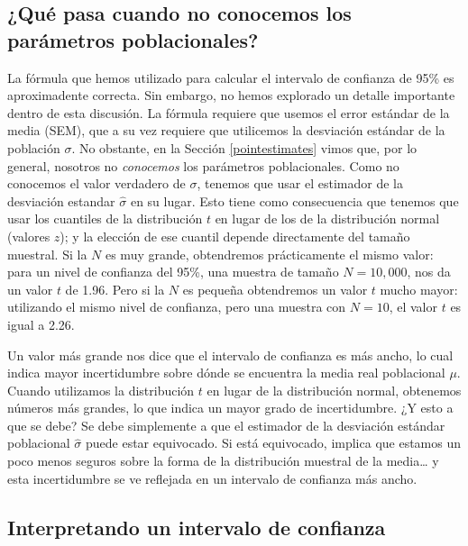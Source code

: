 \documentclass[spanish,]{book}
\begin{document}
\subsection{¿Qué pasa cuando no conocemos los parámetros
poblacionales?}\label{que-pasa-cuando-no-conocemos-los-parametros-poblacionales}

La fórmula que hemos utilizado para calcular el intervalo de confianza
de 95\% es aproximadente correcta. Sin embargo, no hemos explorado un
detalle importante dentro de esta discusión. La fórmula requiere que
usemos el error estándar de la media (SEM), que a su vez requiere que
utilicemos la desviación estándar de la población \(\sigma\). No
obstante, en la Sección \ref{pointestimates} vimos que, por lo general,
nosotros no \emph{conocemos} los parámetros poblacionales. Como no
conocemos el valor verdadero de \(\sigma\), tenemos que usar el
estimador de la desviación estandar \(\hat{\sigma}\) en su lugar. Esto
tiene como consecuencia que tenemos que usar los cuantiles de la
distribución \(t\) en lugar de los de la distribución normal (valores
\(z\)); y la elección de ese cuantil depende directamente del tamaño
muestral. Si la \(N\) es muy grande, obtendremos prácticamente el mismo
valor: para un nivel de confianza del 95\%, una muestra de tamaño
\(N=10,000\), nos da un valor \(t\) de 1.96. Pero si la \(N\) es pequeña
obtendremos un valor \(t\) mucho mayor: utilizando el mismo nivel de
confianza, pero una muestra con \(N=10\), el valor \(t\) es igual a
2.26.

Un valor más grande nos dice que el intervalo de confianza es más ancho,
lo cual indica mayor incertidumbre sobre dónde se encuentra la media
real poblacional \(\mu\). Cuando utilizamos la distribución \(t\) en
lugar de la distribución normal, obtenemos números más grandes, lo que
indica un mayor grado de incertidumbre. ¿Y esto a que se debe? Se debe
simplemente a que el estimador de la desviación estándar poblacional
\(\hat\sigma\) puede estar equivocado. Si está equivocado, implica que
estamos un poco menos seguros sobre la forma de la distribución muestral
de la media\ldots{} y esta incertidumbre se ve reflejada en un intervalo
de confianza más ancho.

\subsection{Interpretando un intervalo de
confianza}\label{interpretando-un-intervalo-de-confianza}
\end{document}
